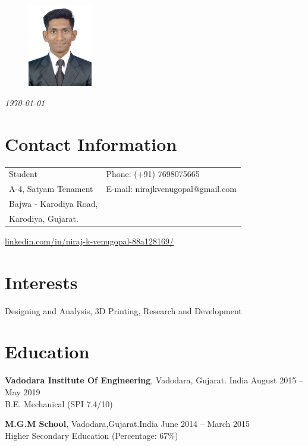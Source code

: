 \documentclass[margin,line]{res}
\begin{document}
\pagecolor{blue!10}
\begin{figure}
\hspace{1.7in}\includegraphics[width=0.25\textwidth]{DSC_8914}
\end{figure}

 \hfill {\em \today}

\begin{resume}
\section{\sc Contact Information}

\vspace{.05in}
\begin{tabular}{@{}p{3.5in}p{3in}}
Student            & {Phone:}  (+91) 7698075665 \\
A-4, Satyam Tenament 
 & {E-mail:}  nirajkvenugopal@gmail.com\\
Bajwa - Karodiya Road, \\
Karodiya, Gujarat.  
\end{tabular}

\hspace{.5in}{LinkedIn ID:} \url{linkedin.com/in/niraj-k-venugopal-88a128169/}


\section{\sc Interests}

 Designing and Analysis, 3D Printing, Research and  Development

\section{\sc Education}
{\bf Vadodara Institute Of Engineering}, Vadodara, Gujarat. India \hfill August 2015 -- May 2019\\
B.E. Mechanical \hfill(SPI 7.4/10)

{\bf M.G.M School}, Vadodara,Gujarat.India \hfill June 2014 -- March 2015\\
Higher Secondary Education \hfill(Percentage:  67\%)



\end{resume}
\end{document}
